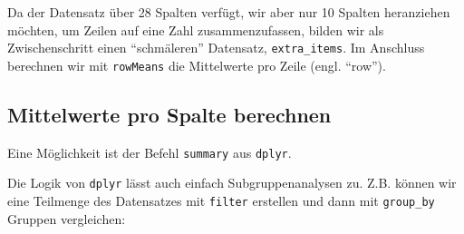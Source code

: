 \documentclass[12pt,ngerman,]{book}
\makeatletter
\newenvironment{Shaded}{\begin{snugshade}}{\end{snugshade}}
\newcommand{\KeywordTok}[1]{\textcolor[rgb]{0.13,0.29,0.53}{\textbf{{#1}}}}
\newcommand{\DataTypeTok}[1]{\textcolor[rgb]{0.13,0.29,0.53}{{#1}}}
\newcommand{\DecValTok}[1]{\textcolor[rgb]{0.00,0.00,0.81}{{#1}}}
\newcommand{\StringTok}[1]{\textcolor[rgb]{0.31,0.60,0.02}{{#1}}}
\newcommand{\CommentTok}[1]{\textcolor[rgb]{0.56,0.35,0.01}{\textit{{#1}}}}
\newcommand{\OtherTok}[1]{\textcolor[rgb]{0.56,0.35,0.01}{{#1}}}
\newcommand{\NormalTok}[1]{{#1}}
\newenvironment{kframe}{%
\medskip{}
\setlength{\fboxsep}{.8em}
 \def\at@end@of@kframe{}%
 \ifinner\ifhmode%
  \def\at@end@of@kframe{\end{minipage}}%
  \begin{minipage}{\columnwidth}%
 \fi\fi%
 \def\FrameCommand##1{\hskip\@totalleftmargin \hskip-\fboxsep
 \colorbox{shadecolor}{##1}\hskip-\fboxsep
     \hskip-\linewidth \hskip-\@totalleftmargin \hskip\columnwidth}%
 \MakeFramed {\advance\hsize-\width
   \@totalleftmargin\z@ \linewidth\hsize
   \@setminipage}}%
 {\par\unskip\endMakeFramed%
 \at@end@of@kframe}
\renewenvironment{Shaded}{\begin{kframe}}{\end{kframe}}
\makeatother
\begin{document}
Da der Datensatz über 28 Spalten verfügt, wir aber nur 10 Spalten
heranziehen möchten, um Zeilen auf eine Zahl zusammenzufassen, bilden
wir als Zwischenschritt einen ``schmäleren'' Datensatz,
\texttt{extra\_items}. Im Anschluss berechnen wir mit \texttt{rowMeans}
die Mittelwerte pro Zeile (engl. ``row'').

\subsection{Mittelwerte pro Spalte
berechnen}\label{mittelwerte-pro-spalte-berechnen}

Eine Möglichkeit ist der Befehl \texttt{summary} aus \texttt{dplyr}.

\begin{Shaded}
\end{Shaded}

Die Logik von \texttt{dplyr} lässt auch einfach Subgruppenanalysen zu.
Z.B. können wir eine Teilmenge des Datensatzes mit \texttt{filter}
erstellen und dann mit \texttt{group\_by} Gruppen vergleichen:

\begin{Shaded}
\end{Shaded}
\end{document}
